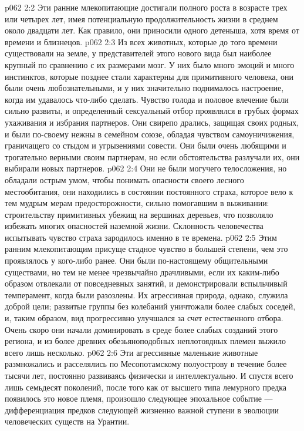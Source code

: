 \vs p062 2:2 Эти ранние млекопитающие достигали полного роста в возрасте трех или четырех лет, имея потенциальную продолжительность жизни в среднем около двадцати лет. Как правило, они приносили одного детеныша, хотя время от времени и близнецов.
\vs p062 2:3 Из всех животных, которые до того времени существовали на земле, у представителей этого нового вида был наиболее крупный по сравнению с их размерами мозг. У них было много эмоций и много инстинктов, которые позднее стали характерны для примитивного человека, они были очень любознательными, и у них значительно поднималось настроение, когда им удавалось что\hyp{}либо сделать. Чувство голода и половое влечение были сильно развиты, и определенный сексуальный отбор проявлялся в грубых формах ухаживания и избрания партнеров. Они свирепо дрались, защищая своих родных, и были по\hyp{}своему нежны в семейном союзе, обладая чувством самоуничижения, граничащего со стыдом и угрызениями совести. Они были очень любящими и трогательно верными своим партнерам, но если обстоятельства разлучали их, они выбирали новых партнеров.
\vs p062 2:4 Они не были могучего телосложения, но обладали острым умом, чтобы понимать опасности своего лесного местообитания, они находились в состоянии постоянного страха, которое вело к тем мудрым мерам предосторожности, сильно помогавшим в выживании: строительству примитивных убежищ на вершинах деревьев, что позволяло избежать многих опасностей наземной жизни. Склонность человечества испытывать чувство страха зародилось именно в те времена.
\vs p062 2:5 Этим ранним млекопитающим присуще стадное чувство в большей степени, чем это проявлялось у кого\hyp{}либо ранее. Они были по\hyp{}настоящему общительными существами, но тем не менее чрезвычайно драчливыми, если их каким\hyp{}либо образом отвлекали от повседневных занятий, и демонстрировали вспыльчивый темперамент, когда были разозлены. Их агрессивная природа, однако, служила доброй цели; развитые группы без колебаний уничтожали более слабых соседей, и, таким образом, вид прогрессивно улучшался за счет естественного отбора. Очень скоро они начали доминировать в среде более слабых созданий этого региона, и из более древних обезьяноподобных неплотоядных племен выжило всего лишь несколько.
\vs p062 2:6 Эти агрессивные маленькие животные размножались и расселялись по Месопотамскому полуострову в течение более тысячи лет, постоянно развиваясь физически и интеллектуально. И спустя всего лишь семьдесят поколений, после того как от высшего типа лемурного предка появилось это новое племя, произошло следующее эпохальное событие ---  дифференциация предков следующей жизненно важной ступени в эволюции человеческих существ на Урантии.
